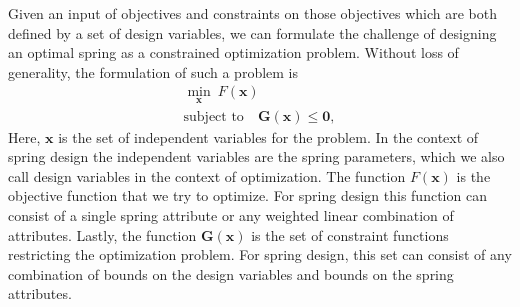 \documentclass[10pt]{article}
\begin{document}
Given an input of objectives and constraints on those objectives which are both defined by a set of design variables, we can formulate the challenge of designing an optimal spring as a constrained optimization problem. Without loss of generality, the formulation of such a problem is
			\begin{equation}
				\begin{gathered}
	 				\min_{\mathbf{x}} \ F(\mathbf{x}) \\
	 				\mbox{subject to} \quad \mathbf{G}(\mathbf{x}) \le \mathbf{0}, 
				\end{gathered}
				\label{eq:General_Problem}	
			\end{equation}
Here, $\mathbf{x}$ is the set of independent variables for the problem. In the context of spring design the independent variables are the spring parameters, which we also call design variables in the context of optimization. The function $F(\mathbf{x})$ is the objective function that we try to optimize. For spring design this function can consist of a single spring attribute or any weighted linear combination of attributes. Lastly, the function $\mathbf{G}(\mathbf{x})$ is the set of constraint functions restricting the optimization problem. For spring design, this set can consist of any combination of bounds on the design variables and bounds on the spring attributes. 
\end{document}
